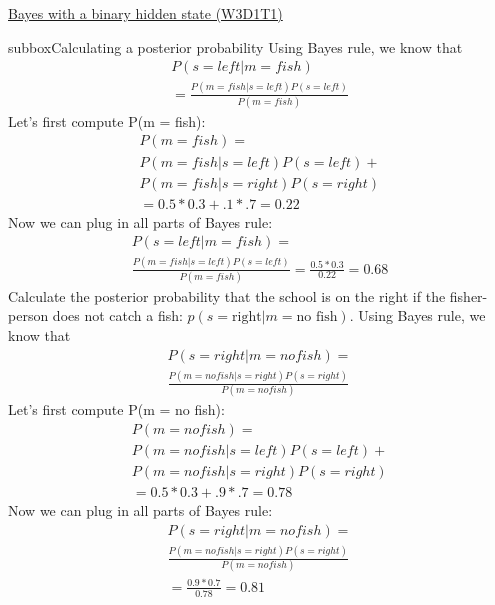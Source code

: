 \begin{textbox}{\href{https://compneuro.neuromatch.io/tutorials/W3D1_BayesianDecisions/student/W3D1_Tutorial1.html}{Bayes with a binary hidden state (W3D1T1)} }
\begin{subbox}{subbox}{Calculating a posterior probability
}
Using Bayes rule, we know that 
\begin{eqnarray*}   
P(s = left | m = fish) \\ 
 = \frac{P(m = fish | s = left)P(s = left)}{P(m = fish)}
            \end{eqnarray*}
Let's first compute P(m = fish):
\begin{eqnarray*}   
   P(m = fish) =  \\
   P(m = fish | s = left)P(s = left) + \\ P(m = fish | s = right)P(s = right)\\
               = 0.5 * 0.3 + .1 * .7
               = 0.22
                \end{eqnarray*}
   Now we can plug in all parts of Bayes rule:
\begin{eqnarray*}     P(s = left | m = fish) =\\
\frac{P(m = fish | s = left)P(s = left) }{ P(m = fish)}
                          = \frac{0.5 * 0.3 }{ 0.22}
                          = 0.68
                          \end{eqnarray*}
Calculate the posterior probability that the school is on the right if the fisher-person does not catch a fish: $p(s = \textrm{right} | m = \textrm{no fish})$. Using Bayes rule, we know that 
\begin{eqnarray*} P(s = right | m = no fish) =\\ \frac{P(m = no fish | s = right)P(s = right) }{ P(m = no fish)}\end{eqnarray*} 
   Let's first compute P(m = no fish):
\begin{eqnarray*}    P(m = no fish) = \\P(m = no fish | s = left)P(s = left) +  \\P(m = no fish | s = right)P(s = right)\\
                  = 0.5 * 0.3 + .9 * .7
                  = 0.78
                  \end{eqnarray*} 
   Now we can plug in all parts of Bayes rule:
 \begin{eqnarray*}    P(s = right | m = no fish) = \\
 \frac{P(m = no fish | s = right)P(s = right) }{ P(m = no fish)}\\
                              = \frac{0.9 * 0.7 }{ 0.78}
                              = 0.81
\end{eqnarray*}  
\end{subbox}

\end{textbox}
